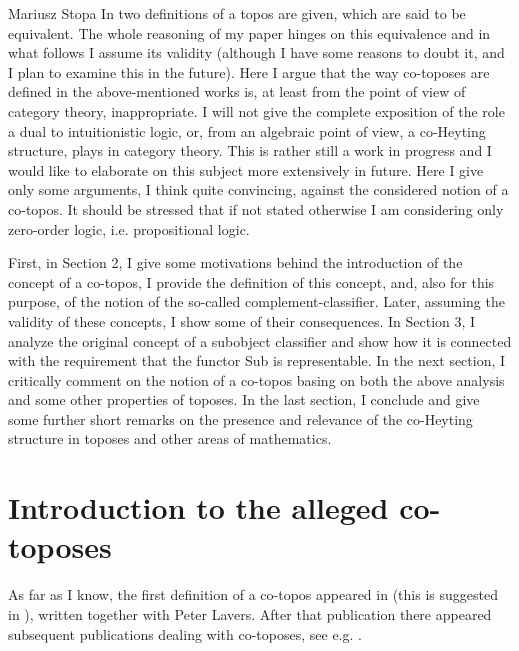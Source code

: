 \begin{artengenv}{Mariusz Stopa}
In \parencite[p.161f and p.163]{maclane-moerdijk-1994} two definitions of a topos are given, which are said to be equivalent. The whole reasoning of my paper hinges on this equivalence and in what follows I assume its validity (although I have some reasons to doubt it, and I plan to examine this in the future). Here I argue that the way co-toposes are defined in the above-mentioned works is, at least from the point of view of category theory, inappropriate. I will not give the complete exposition of the role a dual to intuitionistic logic, or, from an algebraic point of view, a co-Heyting structure, plays in category theory. This is rather still a work in progress and I would like to elaborate on this subject more extensively in future. Here I give only some arguments, I think quite convincing, against the considered notion of a co-topos. It should be stressed that if not stated otherwise I am considering only zero-order logic, i.e. propositional logic.

First, in Section 2, I give some motivations behind the introduction of the concept of a co-topos, I provide the definition of this concept, and, also for this purpose, of the notion of the so-called complement-classifier. Later, assuming the validity of these concepts, I show some of their consequences. In Section 3, I analyze the original concept of a subobject classifier and show how it is connected with the requirement that the functor \textsf{Sub} is representable. In the next section, I critically comment on the notion of a co-topos basing on both the above analysis and some other properties of toposes. In the last section, I conclude and give some further short remarks on the presence and relevance of the co-Heyting structure in toposes and other areas of mathematics.



\section{Introduction to the alleged co-toposes}

As far as I know, the first definition of a co-topos appeared in \parencite[Chapter 11]{mortensen-1995} (this is suggested in \parencite[p.80]{james-phd-1996}), written together with Peter Lavers. After that publication there appeared subsequent publications dealing with co-toposes, see e.g. \parencite{james-phd-1996, mortensen-2003, estrada-gonzalez-2010, estrada-gonzalez-2015}. 


\end{artengenv}
